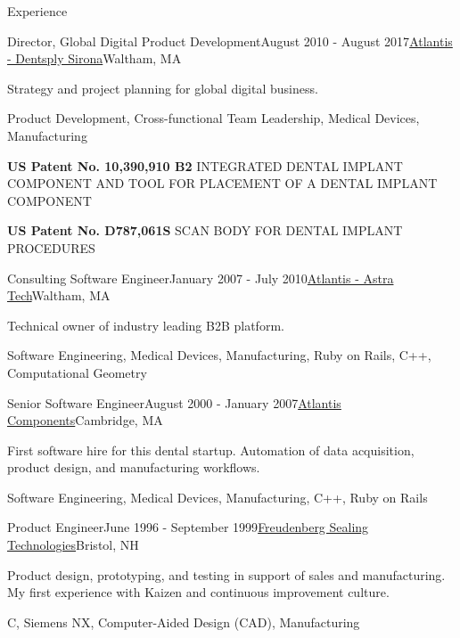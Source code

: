 \documentclass{resume}
\begin{document}
\begin{rSection}{Experience}
\begin{rSubsection}{Director, Global Digital Product Development}{August 2010 - August 2017}{\href{https://dentsplysirona.com}{Atlantis - Dentsply Sirona}}{Waltham, MA}
\item Strategy and project planning for global digital business.
\item Product Development, Cross-functional Team Leadership, Medical Devices, Manufacturing
\item \textbf{US Patent No. 10,390,910 B2} INTEGRATED DENTAL IMPLANT COMPONENT AND TOOL FOR PLACEMENT OF A DENTAL IMPLANT COMPONENT
\item \textbf{US Patent No. D787,061S} SCAN BODY FOR DENTAL IMPLANT PROCEDURES
\end{rSubsection}

\begin{rSubsection}{Consulting Software Engineer}{January 2007 - July 2010}{\href{https://dentsplysirona.com}{Atlantis - Astra Tech}}{Waltham, MA}
\item Technical owner of industry leading B2B platform.
\item Software Engineering, Medical Devices, Manufacturing, Ruby on Rails, C++, Computational Geometry
\end{rSubsection}

\begin{rSubsection}{Senior Software Engineer}{August 2000 - January 2007}{\href{https://dentsplysirona.com}{Atlantis Components}}{Cambridge, MA}
\item First software hire for this dental startup. Automation of data acquisition, product design, and manufacturing workflows.
\item Software Engineering, Medical Devices, Manufacturing, C++, Ruby on Rails
\end{rSubsection}

\begin{rSubsection}{Product Engineer}{June 1996 - September 1999}{\href{https://fst.com}{Freudenberg Sealing Technologies}}{Bristol, NH}
\item Product design, prototyping, and testing in support of sales and manufacturing. My first experience with Kaizen and continuous improvement culture.
\item C, Siemens NX, Computer-Aided Design (CAD), Manufacturing
\end{rSubsection}

\end{rSection}
\end{document}
